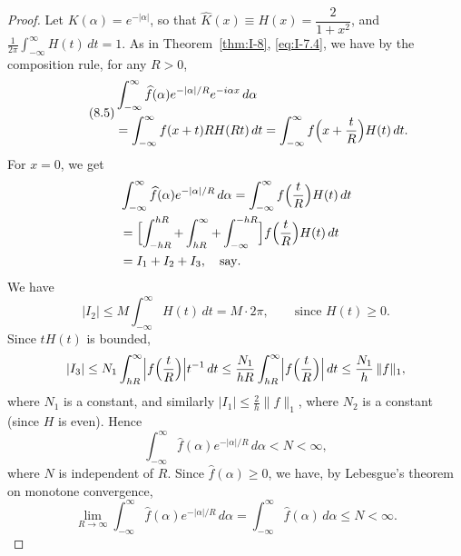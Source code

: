 \begin{proof}
Let $K(\alpha)=e^{-|\alpha|}$, so that $\hat K(x)\equiv H(x)=\dfrac{2}{1+x^{2}}$, and $\frac{1}{2\pi}\int_{-\infty}^{\infty}H(t)\,dt=1$. As in Theorem~\ref{thm:I-8}, \eqref{eq:I-7.4}, we have by the composition rule, for any $R>0$,
\begin{equation}\label{eq:I-8.5}\tag{8.5}
\begin{aligned}
&\int_{-\infty}^{\infty}\widehat f(\alpha)e^{-|\alpha|/R}e^{-i\alpha x}\,d\alpha\\
&= \int_{-\infty}^{\infty}f(x+t)RH(Rt)\,dt = \int_{-\infty}^{\infty}f  \Bigl(x+\frac{t}{R}\Bigr)H(t)\,dt.
\end{aligned}
\end{equation}
For $x=0$, we get
\begin{equation*}
\begin{aligned}
&\int_{-\infty}^{\infty}\widehat f(\alpha)e^{-|\alpha|/R}\,d\alpha = \int_{-\infty}^{\infty}f\Bigl(\frac{t}{R}\Bigr)H(t)\,dt\\
&= \Bigl[\int_{-hR}^{hR}+\int_{hR}^{\infty}+\int_{-\infty}^{-hR}\Bigr]f\Bigl(\frac{t}{R}\Bigr)H(t)\,dt\\
&= I_1+I_2+I_3,\quad\text{say}.
\end{aligned}
\end{equation*}
We have
\begin{equation*}
|I_2|\le M\int_{-\infty}^{\infty}H(t)\,dt=M\cdot 2\pi,\qquad\text{since }H(t)\ge 0.
\end{equation*}
Since $tH(t)$ is bounded,
\begin{equation*}
|I_3|\le N_1\int_{hR}^{\infty}\Bigl|f\Bigl(\frac{t}{R}\Bigr)\Bigr|t^{-1}\,dt
\le\frac{N_1}{hR}\int_{hR}^{\infty}\Bigl|f\Bigl(\frac{t}{R}\Bigr)\Bigr|\,dt
\le\frac{N_1}{h}\,\|f\|_1,
\end{equation*}
where $N_1$ is a constant, and similarly $|I_1|\le\frac{2}{h}\|f\|_1$, where $N_2$ is a constant (since $H$ is even). Hence
\begin{equation*}
\int_{-\infty}^{\infty}\widehat f(\alpha)e^{-|\alpha|/R}\,d\alpha<N<\infty,
\end{equation*}
where $N$ is independent of $R$. Since $\widehat f(\alpha)\ge 0$, we have, by Lebesgue's theorem on monotone convergence,
\begin{equation*}
\lim_{R\to\infty}\int_{-\infty}^{\infty}\widehat f(\alpha)e^{-|\alpha|/R}\,d\alpha
=\int_{-\infty}^{\infty}\widehat f(\alpha)\,d\alpha\le N<\infty.
\end{equation*}
\end{proof}

